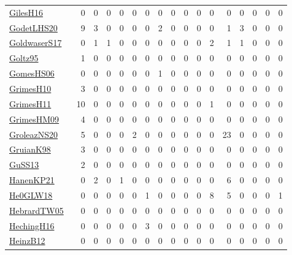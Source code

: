 {\begin{longtable}{l*{16}{r}}
\href{papers/GilesH16.pdf}{GilesH16}~\cite{GilesH16} & 0 & 0 & 0 & 0 & 0 & 0 & 0 & 0 & 0 & 0 & 0 & 0 & 0 & 0 & 0 & 0\\
\href{papers/GodetLHS20.pdf}{GodetLHS20}~\cite{GodetLHS20} & 9 & 3 & 0 & 0 & 0 & 0 & 2 & 0 & 0 & 0 & 0 & 1 & 3 & 0 & 0 & 0\\
\href{papers/GoldwaserS17.pdf}{GoldwaserS17}~\cite{GoldwaserS17} & 0 & 1 & 1 & 0 & 0 & 0 & 0 & 0 & 0 & 0 & 2 & 1 & 1 & 0 & 0 & 0\\
\href{papers/Goltz95.pdf}{Goltz95}~\cite{Goltz95} & 1 & 0 & 0 & 0 & 0 & 0 & 0 & 0 & 0 & 0 & 0 & 0 & 0 & 0 & 0 & 0\\
\href{papers/GomesHS06.pdf}{GomesHS06}~\cite{GomesHS06} & 0 & 0 & 0 & 0 & 0 & 0 & 1 & 0 & 0 & 0 & 0 & 0 & 0 & 0 & 0 & 0\\
\href{papers/GrimesH10.pdf}{GrimesH10}~\cite{GrimesH10} & 3 & 0 & 0 & 0 & 0 & 0 & 0 & 0 & 0 & 0 & 0 & 0 & 0 & 0 & 0 & 0\\
\href{papers/GrimesH11.pdf}{GrimesH11}~\cite{GrimesH11} & 10 & 0 & 0 & 0 & 0 & 0 & 0 & 0 & 0 & 0 & 1 & 0 & 0 & 0 & 0 & 0\\
\href{papers/GrimesHM09.pdf}{GrimesHM09}~\cite{GrimesHM09} & 4 & 0 & 0 & 0 & 0 & 0 & 0 & 0 & 0 & 0 & 0 & 0 & 0 & 0 & 0 & 0\\
\href{papers/GroleazNS20.pdf}{GroleazNS20}~\cite{GroleazNS20} & 5 & 0 & 0 & 0 & 2 & 0 & 0 & 0 & 0 & 0 & 0 & 23 & 0 & 0 & 0 & 0\\
\href{papers/GruianK98.pdf}{GruianK98}~\cite{GruianK98} & 3 & 0 & 0 & 0 & 0 & 0 & 0 & 0 & 0 & 0 & 0 & 0 & 0 & 0 & 0 & 0\\
\href{papers/GuSS13.pdf}{GuSS13}~\cite{GuSS13} & 2 & 0 & 0 & 0 & 0 & 0 & 0 & 0 & 0 & 0 & 0 & 0 & 0 & 0 & 0 & 0\\
\href{papers/HanenKP21.pdf}{HanenKP21}~\cite{HanenKP21} & 0 & 2 & 0 & 1 & 0 & 0 & 0 & 0 & 0 & 0 & 0 & 6 & 0 & 0 & 0 & 0\\
\href{papers/He0GLW18.pdf}{He0GLW18}~\cite{He0GLW18} & 0 & 0 & 0 & 0 & 0 & 1 & 0 & 0 & 0 & 0 & 8 & 5 & 0 & 0 & 0 & 1\\
\href{papers/HebrardTW05.pdf}{HebrardTW05}~\cite{HebrardTW05} & 0 & 0 & 0 & 0 & 0 & 0 & 0 & 0 & 0 & 0 & 0 & 0 & 0 & 0 & 0 & 0\\
\href{papers/HechingH16.pdf}{HechingH16}~\cite{HechingH16} & 0 & 0 & 0 & 0 & 0 & 3 & 0 & 0 & 0 & 0 & 0 & 0 & 0 & 0 & 0 & 0\\
\href{papers/HeinzB12.pdf}{HeinzB12}~\cite{HeinzB12} & 0 & 0 & 0 & 0 & 0 & 0 & 0 & 0 & 0 & 0 & 0 & 0 & 0 & 0 & 0 & 0\\

\end{longtable}}
